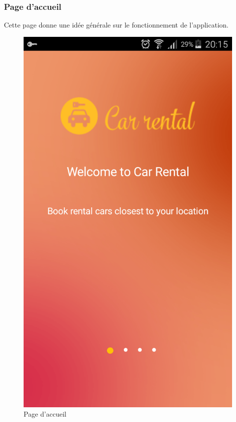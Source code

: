 \documentclass[12pt,a4paper]{report}
\begin{document}
	\subsubsection{Page d'accueil}
Cette page donne une idée générale sur le fonctionnement de l'application.
	\vspace{2cm}
	\begin{figure}[!hbtp]
		\centering
		\includegraphics[scale=0.2]{./graphics/Accueil.png}
		\caption{Page d'accueil}
		\end{figure}
		\newpage
\end{document}
